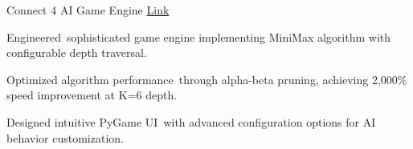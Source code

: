 \begin{cventries}
  \cventry
    {Connect 4 AI Game Engine} %
    {} %
    {}
    {\textcolor{link}{\href{https://github.com/ad3ldev/Connect4-with-AI}{Link}}} %
    {
      \begin{cvitems} %
        \item {Engineered sophisticated game engine implementing MiniMax algorithm with configurable depth traversal.}
        \item {Optimized algorithm performance through alpha-beta pruning, achieving 2,000\% speed improvement at K=6 depth.}
        \item {Designed intuitive PyGame UI with advanced configuration options for AI behavior customization.}
      \end{cvitems}
    }
    
\end{cventries}
